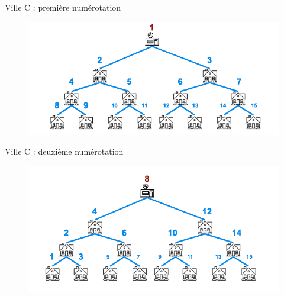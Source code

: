 \documentclass[10pt,xcolor=dvipsnames]{beamer}
\begin{document}
\begin{frame}{Ville C : première numérotation}
        \begin{figure}
        \centering
        \includegraphics[scale=0.40]{figures/CM0/Pizzeria-5.png}

        \label{fig:piz5}
    \end{figure}
    
    \begin{center}
        
    \end{center}
\end{frame}

\begin{frame}{Ville C : deuxième numérotation}
        \begin{figure}
        \centering
        \includegraphics[scale=0.40]{figures/CM0/Pizzeria-6.png}

        \label{fig:piz6}
    \end{figure}
    
\end{frame}
\end{document}
